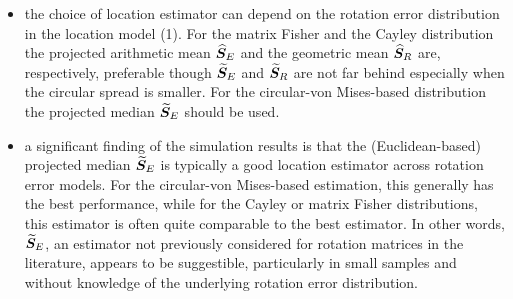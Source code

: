 \begin{itemize}
\item the choice of location estimator can depend on the rotation error distribution in the location model (1).  For the matrix Fisher and the Cayley distribution  the projected arithmetic mean ${\widehat{\bm S}_E}$ and the geometric mean ${\widehat{\bm S}_R}$ are, respectively, preferable though ${\widetilde{\bm S}_E}$ and ${\widetilde{\bm S}_R}$ are not far behind especially when the circular spread is smaller. For the circular-von Mises-based distribution  the projected median ${\widetilde{\bm S}_E}$  should be used.

\item   a significant finding of the simulation results is that the (Euclidean-based)  projected median ${\widetilde{\bm S}_E}$ is typically a good location estimator across rotation error models.  For the circular-von Mises-based estimation, this generally has the best performance, while for the Cayley or matrix Fisher distributions, this estimator is often quite comparable to the best estimator.  In other words, ${\widetilde{\bm S}_E}$, an estimator  not previously considered for rotation matrices in the literature, appears to be suggestible, particularly in small samples and without knowledge of the underlying rotation error distribution.

\end{itemize}